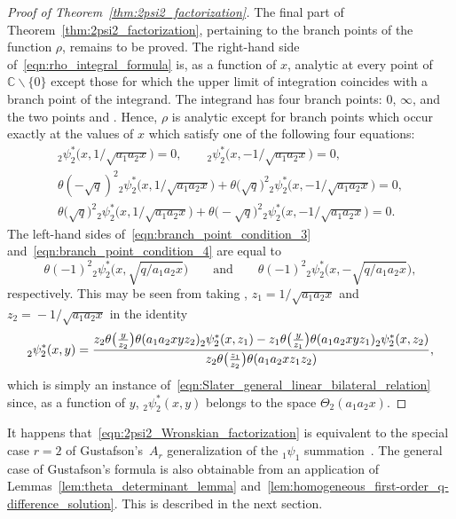\documentclass[10pt,a4paper]{amsart}
\numberwithin{equation}{section}
\newcommand{\C}{\mathbb{C}}
\begin{document}
\begin{proof}[Proof of Theorem~\ref{thm:2psi2_factorization}]
The final part of Theorem~\ref{thm:2psi2_factorization}, pertaining to the branch points of the function $\rho$, remains to be proved. The right-hand side of~\eqref{eqn:rho_integral_formula} is, as a function of $x$, analytic at every point of~${\C \backslash \{0\}}$ except those for which the upper limit of integration coincides with a branch point of the integrand. The integrand has four branch points: $0$, $\infty$, and the two points  and . Hence, $\rho$ is analytic except for branch points which occur exactly at the values of $x$ which satisfy one of the following four equations:
\begin{gather}
_2^{}\psi_2^\ast\bigl(x,1/\sqrt{a_1a_2x}\bigr) = 0, \qquad
_2^{}\psi_2^\ast\bigl(x,-1/\sqrt{a_1a_2x}\bigr) = 0, \nonumber \\
\theta(-\sqrt{q})^2 {}_2^{}\psi_2^\ast\bigl(x,1/\sqrt{a_1a_2x}\bigr) + \theta\bigl(\sqrt{q}\bigr)^2 {}_2^{}\psi_2^\ast\bigl(x,-1/\sqrt{a_1a_2x}\bigr) = 0, \label{eqn:branch_point_condition_3} \\
\theta\bigl(\sqrt{q}\bigr)^2 {}_2^{}\psi_2^\ast\bigl(x,1/\sqrt{a_1a_2x}\bigr) + \theta\bigl(-\sqrt{q}\bigr)^2 {}_2^{}\psi_2^\ast\bigl(x,-1/\sqrt{a_1a_2x}\bigr) = 0. \label{eqn:branch_point_condition_4}
\end{gather}
The left-hand sides of~\eqref{eqn:branch_point_condition_3} and~\eqref{eqn:branch_point_condition_4} are equal to
\[ \theta(-1)^2{}_2^{}\psi_2^\ast\bigl(x,\sqrt{q/a_1a_2x}\bigr) \qquad \text{and} \qquad \theta(-1)^2{}_2^{}\psi_2^\ast\bigl(x,-\sqrt{q/a_1a_2x}\bigr), \]
respectively. This may be seen from taking , $z_1=1/\!\sqrt{a_1a_2x}$ and $z_2=\!-1/\!\sqrt{a_1a_2x}$ in the identity
\[ _2^{}\psi_2^\ast(x,y) = {z_2\theta\bigl({y \over z_2}\bigr) \theta(a_1a_2xyz_2) {}_2^{}\psi_2^\ast(x,z_1) - z_1\theta\bigl({y \over z_1}\bigr) \theta(a_1a_2xyz_1) {}_2^{}\psi_2^\ast(x,z_2) \over z_2\theta\bigl({z_1 \over z_2}\bigr) \theta(a_1a_2xz_1z_2)}, \]
which is simply an instance of~\eqref{eqn:Slater_general_linear_bilateral_relation} since, as a function of $y$, $_2^{}\psi_2^\ast(x,y)$ belongs to the space $\Theta_2(a_1a_2x)$.
\end{proof}


\begin{Remark}\label{rmk:Gustafson_equivalence}
It happens that~\eqref{eqn:2psi2_Wronskian_factorization} is equivalent to the special case $r=2$ of Gustafson's~$A_r$ generalization of the $_1\psi_1$ summation~\cite[Theorem~1.17]{Gustafson1987}. The general case of Gustafson's formula is also obtainable from an application of Lemmas~\ref{lem:theta_determinant_lemma} and~\ref{lem:homogeneous_first-order_q-difference_solution}. This is described in the next section.
\end{Remark}
\end{document}

